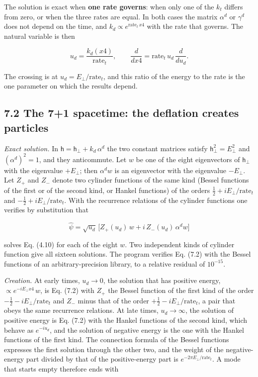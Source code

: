 \documentclass[
  10pt,
]{article}
\begin{document}
The solution is exact when \textbf{one rate governs}: when only one of
the \(k_t\) differs from zero, or when the three rates are equal. In
both cases the matrix \(\alpha^d\) or \(\gamma^d\) does not depend on
the time, and \(k_d\propto e^{\mathrm{rate}_t\,x4}\) with the rate that
governs. The natural variable is then

\[u_d=\frac{k_d(x4)}{\mathrm{rate}_t},\qquad\frac{d}{dx4}=\mathrm{rate}_t\,u_d\,\frac{d}{du_d}.\tag{7.1}\]

The crossing is at \(u_d=E_\perp/\mathrm{rate}_t\), and this ratio of
the energy to the rate is the one parameter on which the results depend.

\hypertarget{the-71-spacetime-the-deflation-creates-particles}{%
\subsection{7.2 The 7+1 spacetime: the deflation creates
particles}\label{the-71-spacetime-the-deflation-creates-particles}}

\emph{Exact solution.} In \(\mathsf h=\mathsf h_\perp+k_d\,\alpha^d\)
the two constant matrices satisfy \(\mathsf h_\perp^2=E_\perp^2\) and
\((\alpha^d)^2=1\), and they anticommute. Let \(w\) be one of the eight
eigenvectors of \(\mathsf h_\perp\) with the eigenvalue \(+E_\perp\);
then \(\alpha^dw\) is an eigenvector with the eigenvalue \(-E_\perp\).
Let \(Z_+\) and \(Z_-\) denote two cylinder functions of the same kind
(Bessel functions of the first or of the second kind, or Hankel
functions) of the orders \(\tfrac12+iE_\perp/\mathrm{rate}_t\) and
\(-\tfrac12+iE_\perp/\mathrm{rate}_t\). With the recurrence relations of
the cylinder functions one verifies by substitution that

\[\hat\psi=\sqrt{u_d}\,\Big[Z_+(u_d)\,w+i\,Z_-(u_d)\,\alpha^dw\Big]\tag{7.2}\]

solves Eq. (4.10) for each of the eight \(w\). Two independent kinds of
cylinder function give all sixteen solutions. The program verifies Eq.
(7.2) with the Bessel functions of an arbitrary-precision library, to a
relative residual of \(10^{-15}\).

\emph{Creation.} At early times, \(u_d\to0\), the solution that has
positive energy, \(\propto e^{-iE_\perp x4}\,w\), is Eq. (7.2) with
\(Z_+\) the Bessel function of the first kind of the order
\(-\tfrac12-iE_\perp/\mathrm{rate}_t\) and \(Z_-\) minus that of the
order \(+\tfrac12-iE_\perp/\mathrm{rate}_t\), a pair that obeys the same
recurrence relations. At late times, \(u_d\to\infty\), the solution of
positive energy is Eq. (7.2) with the Hankel functions of the second
kind, which behave as \(e^{-iu_d}\), and the solution of negative energy
is the one with the Hankel functions of the first kind. The connection
formula of the Bessel functions expresses the first solution through the
other two, and the weight of the negative-energy part divided by that of
the positive-energy part is \(e^{-2\pi E_\perp/\mathrm{rate}_t}\). A
mode that starts empty therefore ends with
\end{document}
